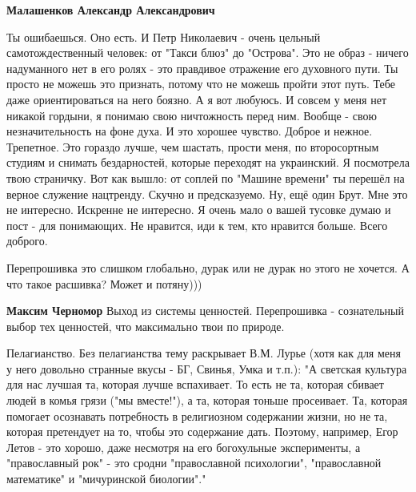 \begin{itemize}
\begin{itemize}
\textbf{Малашенков Александр Александрович} 

Ты ошибаешься. Оно есть. И Петр Николаевич - очень цельный самотождественный
человек: от "Такси блюз" до "Острова". Это не образ - ничего надуманного нет в
его ролях - это правдивое отражение его духовного пути. Ты просто не можешь это
признать, потому что не можешь пройти этот путь. Тебе даже ориентироваться на
него боязно. А я вот любуюсь. И совсем у меня нет никакой гордыни, я понимаю
свою ничтожность перед ним. Вообще - свою незначительность на фоне духа. И это
хорошее чувство. Доброе и нежное. Трепетное. Это гораздо лучше, чем шастать,
прости меня, по второсортным студиям и снимать бездарностей, которые переходят
на украинский. Я посмотрела твою страничку. Вот как вышло: от соплей по "Машине
времени" ты перешёл на верное служение нацтренду. Скучно и предсказуемо. Ну,
ещё один Брут. Мне это не интересно. Искренне не интересно. Я очень мало о
вашей тусовке думаю и пост - для понимающих. Не нравится, иди к тем, кто
нравится больше. Всего доброго.

\end{itemize}

 
Перепрошивка это слишком глобально, дурак или не дурак но этого не хочется. А
что такое расшивка? Может и потяну)))

\begin{itemize}
 
\textbf{Максим Черномор} Выход из системы ценностей. Перепрошивка - сознательный выбор тех ценностей, что максимально твои по природе.
\end{itemize}

 

Пелагианство. Без пелагианства тему раскрывает В.М. Лурье (хотя как для меня у
него довольно странные вкусы - БГ, Свинья, Умка и т.п.): "А светская культура
для нас лучшая та, которая лучше вспахивает. То есть не та, которая сбивает
людей в комья грязи ("мы вместе!"), а та, которая тоньше просеивает. Та,
которая помогает осознавать потребность в религиозном содержании жизни, но не
та, которая претендует на то, чтобы это содержание дать. Поэтому, например,
Егор Летов - это хорошо, даже несмотря на его богохульные эксперименты, а
"православный рок" - это сродни "православной психологии", "православной
математике" и "мичуринской биологии"."


\end{itemize}
